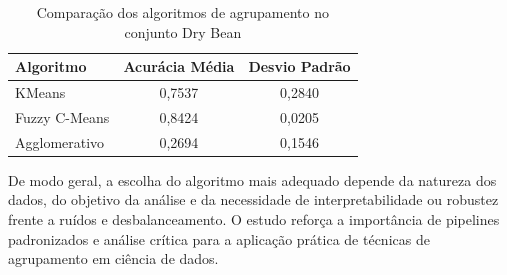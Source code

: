 \begin{table}[H]
\centering
\caption{Comparação dos algoritmos de agrupamento no conjunto Dry Bean}
\begin{tabular}{lcc}
\toprule
\textbf{Algoritmo} & \textbf{Acurácia Média} & \textbf{Desvio Padrão} \\
\midrule
KMeans & 0,7537 & 0,2840 \\
Fuzzy C-Means & 0,8424 & 0,0205 \\
Agglomerativo & 0,2694 & 0,1546 \\
\bottomrule
\end{tabular}
\label{tab:comparacao_drybean}
\end{table}

De modo geral, a escolha do algoritmo mais adequado depende da natureza dos dados, do objetivo da análise e da necessidade de interpretabilidade ou robustez frente a ruídos e desbalanceamento. O estudo reforça a importância de pipelines padronizados e análise crítica para a aplicação prática de técnicas de agrupamento em ciência de dados.
